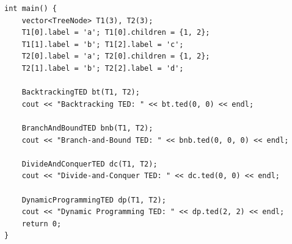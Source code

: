 \documentclass[a4paper,12pt]{article}
\begin{document}
\begin{lstlisting}
int main() {
    vector<TreeNode> T1(3), T2(3);
    T1[0].label = 'a'; T1[0].children = {1, 2};
    T1[1].label = 'b'; T1[2].label = 'c';
    T2[0].label = 'a'; T2[0].children = {1, 2};
    T2[1].label = 'b'; T2[2].label = 'd';

    BacktrackingTED bt(T1, T2);
    cout << "Backtracking TED: " << bt.ted(0, 0) << endl;

    BranchAndBoundTED bnb(T1, T2);
    cout << "Branch-and-Bound TED: " << bnb.ted(0, 0, 0) << endl;

    DivideAndConquerTED dc(T1, T2);
    cout << "Divide-and-Conquer TED: " << dc.ted(0, 0) << endl;

    DynamicProgrammingTED dp(T1, T2);
    cout << "Dynamic Programming TED: " << dp.ted(2, 2) << endl;
    return 0;
}
\end{lstlisting}
\end{document}
